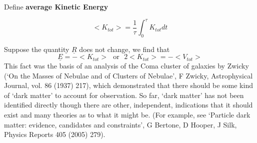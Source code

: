 Define {\bf average Kinetic Energy}
\begin{definition}
  \begin{equation}
    \label{eq: average-kinetic-energy}
    <K_{tot}> = \frac{1}{\tau}\int_{0}^{\tau}K_{tot}dt
  \end{equation}
\end{definition}

Suppose the quantity $\underline{R}$ does not change, we find that
$$\underline{E} = -<K_{tot}> \ \ \ \text{or} \ \ \ 2 <K_{tot}> = -<V_{tot}>$$
This fact was the basis of an analysis of the Coma cluster of galaxies by Zwicky (‘On
the Masses of Nebulae and of Clusters of Nebulae’, F Zwicky, Astrophysical Journal, vol.
86 (1937) 217), which demonstrated that there should be some kind of ‘dark matter’ to
account for observation. So far, ‘dark matter’ has not been identified directly though there
are other, independent, indications that it should exist and many theories as to what it
might be. (For example, see ‘Particle dark matter: evidence, candidates and constraints’,
G Bertone, D Hooper, J Silk, Physics Reports 405 (2005) 279).
